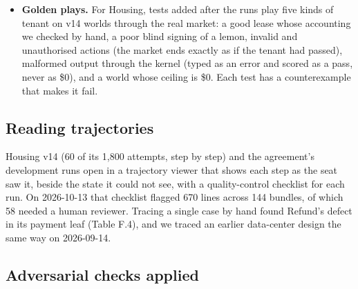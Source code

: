 \begin{itemize}
  contract did not state. Refund tests that a plan has a single agent seat, and the agreement case tests its
  evaluation sets.
\item
  \textbf{Golden plays.} For Housing, tests added after the runs play five kinds of tenant on v14 worlds through the real
  market: a good lease whose accounting we checked by hand, a poor blind signing of a lemon, invalid and unauthorised
  actions (the market ends exactly as if the tenant had passed), malformed output through the kernel (typed as an
  error and scored as a pass, never as \$0), and a world whose ceiling is \$0. Each test has a counterexample that makes
  it fail.
\end{itemize}

\subsection{Reading trajectories}\label{reading-trajectories}

Housing v14 (60 of its 1,800 attempts, step by step) and the agreement's development runs open in a trajectory viewer
that shows each step as the seat saw it, beside the state it could not see, with a quality-control checklist for each
run. On 2026-10-13 that checklist flagged 670 lines across 144 bundles, of which 58 needed a human reviewer. Tracing a
single case by hand found Refund's defect in its payment leaf (Table F.4), and we traced an earlier data-center design
the same way on 2026-09-14.

\subsection{Adversarial checks applied}\label{adversarial-checks-applied}


